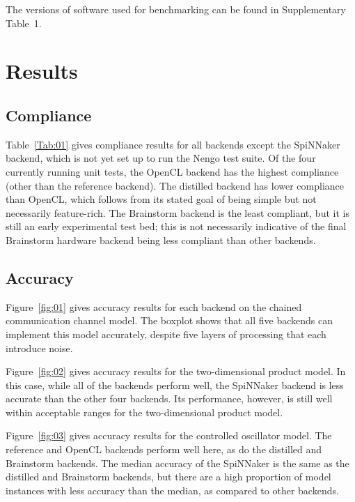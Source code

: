 \documentclass{frontiersSCNS}
\begin{document}
The versions of software
used for benchmarking can be found in
Supplementary Table~1.

\section{Results}

\subsection{Compliance}

Table~\ref{Tab:01} gives compliance results for
all backends except the SpiNNaker backend,
which is not yet set up to run the Nengo test suite.
Of the four currently running unit tests,
the OpenCL backend has the highest compliance
(other than the reference backend).
The distilled backend has lower compliance
than OpenCL, which follows from its stated goal
of being simple but not necessarily feature-rich.
The Brainstorm backend is the least compliant,
but it is still an early experimental test bed;
this is not necessarily indicative of the
final Brainstorm hardware backend being
less compliant than other backends.

\subsection{Accuracy}

Figure~\ref{fig:01} gives accuracy results
for each backend on the chained communication channel model.
The boxplot shows that all five backends can
implement this model accurately,
despite five layers of processing
that each introduce noise.

Figure~\ref{fig:02} gives accuracy results
for the two-dimensional product model.
In this case, while all of the backends
perform well, the SpiNNaker backend
is less accurate than the other four backends.
Its performance, however, is still well within
acceptable ranges for the two-dimensional product model.

Figure~\ref{fig:03} gives accuracy results
for the controlled oscillator model.
The reference and OpenCL backends perform well here,
as do the distilled and Brainstorm backends.
The median accuracy of the SpiNNaker is
the same as the distilled and Brainstorm backends,
but there are a high proportion of model instances
with less accuracy than the median,
as compared to other backends.
\end{document}
